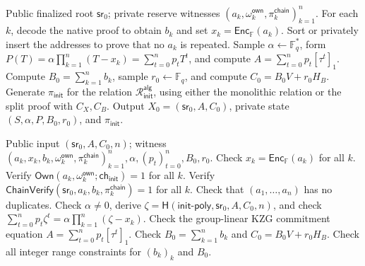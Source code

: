 \documentclass[runningheads]{llncs}
\newcommand{\F}{\mathbb{F}}
\newcommand{\Enc}{\mathsf{Enc}}
\newcommand{\sr}{\mathsf{sr}}
\newcommand{\Rel}{\mathcal{R}}
\newcommand{\Hash}{\mathsf{H}}
\begin{document}
\begin{algorithm}[H]
\caption{Algebraic initialization protocol}
\label{alg:alg-init}
\begin{algorithmic}[1]
\Require Public finalized root \(\sr_0\); private reserve witnesses \((a_k,\omega_k^{\mathsf{own}},\pi_k^{\mathsf{chain}})_{k=1}^n\).
\State For each \(k\), decode the native proof to obtain \(b_k\) and set \(x_k=\Enc_{\F}(a_k)\).
\State Sort or privately insert the addresses to prove that no \(a_k\) is repeated.
\State Sample \(\alpha\leftarrow\F_q^*\), form \(P(T)=\alpha\prod_{k=1}^n(T-x_k)=\sum_{t=0}^np_tT^t\), and compute \(A=\sum_{t=0}^np_t[\tau^t]_1\).
\State Compute \(B_0=\sum_{k=1}^nb_k\), sample \(r_0\leftarrow\F_q\), and compute \(C_0=B_0V+r_0H_B\).
\State Generate \(\pi_{\mathsf{init}}\) for the relation \(\Rel_{\mathsf{init}}^{\mathsf{alg}}\), using either the monolithic relation or the split proof with \(C_X,C_B\).
\State Output \(X_0=(\sr_0,A,C_0)\), private state \((S,\alpha,P,B_0,r_0)\), and \(\pi_{\mathsf{init}}\).
\end{algorithmic}
\end{algorithm}

\begin{algorithm}[H]
\caption{Algebraic initialization relation \(\Rel_{\mathsf{init}}^{\mathsf{alg}}\)}
\label{alg:alg-init-rel}
\begin{algorithmic}[1]
\Require Public input \((\sr_0,A,C_0,n)\); witness \((a_k,x_k,b_k,\omega_k^{\mathsf{own}},\pi_k^{\mathsf{chain}})_{k=1}^n,\alpha,(p_t)_{t=0}^n,B_0,r_0\).
\State Check \(x_k=\Enc_{\F}(a_k)\) for all \(k\).
\State Verify \(\mathsf{Own}(a_k,\omega_k^{\mathsf{own}};\mathsf{ch}_{\mathsf{init}})=1\) for all \(k\).
\State Verify \(\mathsf{ChainVerify}(\sr_0,a_k,b_k,\pi_k^{\mathsf{chain}})=1\) for all \(k\).
\State Check that \((a_1,\ldots,a_n)\) has no duplicates.
\State Check \(\alpha\ne0\), derive \(\zeta=\Hash(\mathsf{init\mbox{-}poly},\sr_0,A,C_0,n)\), and check \(\sum_{t=0}^np_t\zeta^t=\alpha\prod_{k=1}^n(\zeta-x_k)\).
\State Check the group-linear KZG commitment equation \(A=\sum_{t=0}^np_t[\tau^t]_1\).
\State Check \(B_0=\sum_{k=1}^nb_k\) and \(C_0=B_0V+r_0H_B\).
\State Check all integer range constraints for \((b_k)_k\) and \(B_0\).
\end{algorithmic}
\end{algorithm}
\end{document}
